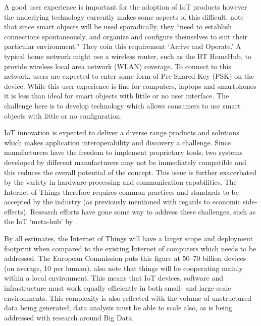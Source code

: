         A good user experience is important for the adoption of IoT products however the underlying technology currently makes some aspects of this difficult. \citet{fromIoC} note that since smart objects will be used sporadically, they ``need to establish connections spontaneously, and organize and configure themselves to suit their particular environment.'' They coin this requirement `Arrive and Operate.' A typical home network might use a wireless router, such as the BT HomeHub, to provide wireless local area network (WLAN) coverage. To connect to this network, users are expected to enter some form of Pre-Shared Key (PSK) on the device. While this user experience is fine for computers, laptops and smartphones it is less than ideal for smart objects with little or no user interface. The challenge here is to develop technology which allows consumers to use smart objects with little or no configuration.

        IoT innovation is expected to deliver a diverse range products and solutions which makes application interoperability and discovery a challenge. Since manufacturers have the freedom to implement proprietary tools, two systems developed by different manufacturers may not be immediately compatible and this reduces the overall potential of the concept. This issue is further exacerbated by the variety in hardware processing and communication capabilities. The Internet of Things therefore requires common practices and standards to be accepted by the industry (as previously mentioned with regards to economic side-effects). Research efforts have gone some way to address these challenges, such as the IoT `meta-hub' by \citet{interoperability:2015}.

        By all estimates, the Internet of Things will have a larger scope and deployment footprint when compared to the existing Internet of computers which needs to be addressed. The European Commission puts this figure at 50--70 billion devices (on average, 10 per human). \citet{fromIoC} also note that things will be cooperating mainly within a local environment. This means that IoT devices, software and infrastructure must work equally efficiently in both small- and large-scale environments. This complexity is also reflected with the volume of unstructured data being generated; data analysis must be able to scale also, as is being addressed with research around Big Data.

